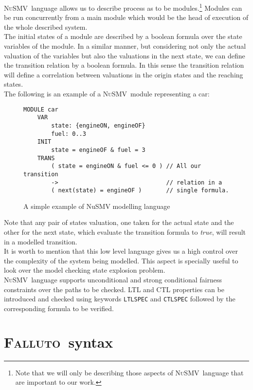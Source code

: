 \documentclass{llncs2e/llncs}
\newcommand{\nusmvSp}{\mbox{\textsc{NuSMV~}}}
\newcommand{\fallutoSp}{\nohyphens{\textsc{Falluto~}}}  %
\begin{document}
\nusmvSp language allows us to describe process as to be modules.\footnote{Note
that we will only be describing those aspects of \nusmvSp language that are
important to our work.} Modules can be run concurrently from a main module
which would be the head of execution of the whole described system.\\
The initial states of a module are described by a boolean formula over the
state variables of the module. In a similar manner, but considering not
only the actual valuation of the variables but also the valuations in
the next state, we can define the transition relation by a boolean formula.
In this sense the transition relation will define a correlation between
valuations in the origin states and the reaching states.\\
The following is an example of a \nusmvSp module representing a car:
\begin{figure}[H]
\begin{framed}
\begin{verbatim}
MODULE car
    VAR
        state: {engineON, engineOF}
        fuel: 0..3
    INIT
        state = engineOF & fuel = 3
    TRANS
        ( state = engineON & fuel <= 0 ) // All our transition
        ->                               // relation in a
        ( next(state) = engineOF )       // single formula.
\end{verbatim}
\end{framed}
    \caption{A simple example of NuSMV modelling language}
    \label{nusmvexample}
\end{figure}
\noindent Note that any pair of states valuation, one taken for the actual state and the other for the next state, which evaluate the transition formula to \textit{true}, will result in a modelled transition.\\It is worth to mention that this low level language gives us a high control over the complexity of the system being modelled. This aspect is specially useful to look over the model checking state explosion problem.\\
\nusmvSp language supports unconditional and strong conditional fairness constraints over the paths to be checked. LTL and CTL properties can be introduced and checked using keywords \texttt{LTLSPEC} and \texttt{CTLSPEC} followed by the corresponding formula to be verified.
\newpage



\section{\fallutoSp syntax}
\end{document}
